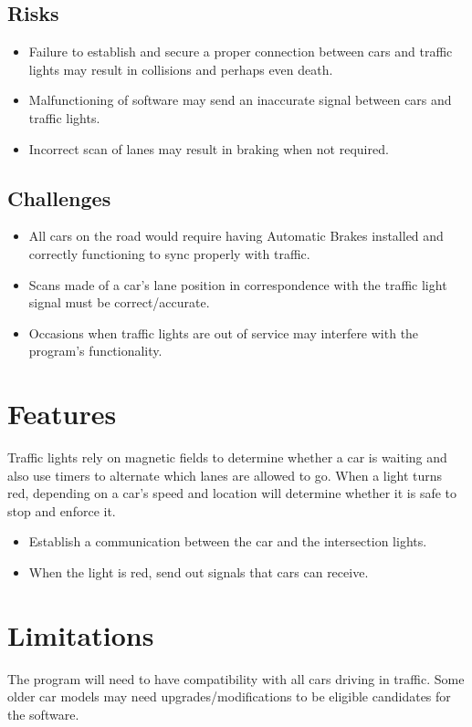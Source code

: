 \documentclass[12pt]{article}
\begin{document}
\subsection{Risks}
\begin{itemize}
	\item Failure to establish and secure a proper connection between cars and traffic lights may result in collisions and perhaps even death.  
	\item Malfunctioning of software may send an inaccurate signal between cars and traffic lights.
	\item Incorrect scan of lanes may result in braking when not required.
\end{itemize}
\subsection{Challenges}
\begin{itemize}
	\item All cars on the road would require having Automatic Brakes installed and correctly functioning to sync properly with traffic.
	\item Scans made of a car's lane position in correspondence with the traffic light signal must be correct/accurate.
	\item Occasions when traffic lights are out of service may interfere with the program's functionality.
\end{itemize}
\section{Features}
Traffic lights rely on magnetic fields to determine whether a car is waiting and also use timers to alternate which lanes are allowed to go. When a light turns red, depending on a car's speed and location will determine whether it is safe to stop and enforce it.
\begin{itemize}
	\item Establish a communication between the car and the intersection lights.
	\item When the light is red, send out signals that cars can receive.
\end{itemize}
\section{Limitations}
The program will need to have compatibility with all cars driving in traffic. Some older car models may need upgrades/modifications to be eligible candidates for the software.
\end{document}
